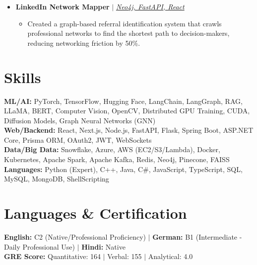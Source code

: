 \documentclass[10pt,a4paper]{article}
\newcommand{\resumeItem}[1]{\item\small{#1}}
\begin{document}
\begin{itemize}[label={}]
    \item \textbf{LinkedIn Network Mapper} $|$ \emph{\href{https://github.com/KartavyaDikshit/LinkedIn-Mapper}{Neo4j, FastAPI, React}}
    \begin{itemize}
        \resumeItem{Created a graph-based referral identification system that crawls professional networks to find the shortest path to decision-makers, reducing networking friction by 50\%.}
    \end{itemize}
\end{itemize}

\section{Skills}
\begin{itemize}[label={}]
    \small{\item{
     \textbf{ML/AI:}{ PyTorch, TensorFlow, Hugging Face, LangChain, LangGraph, RAG, LLaMA, BERT, Computer Vision, OpenCV, Distributed GPU Training, CUDA, Diffusion Models, Graph Neural Networks (GNN)} \\
     \textbf{Web/Backend:}{ React, Next.js, Node.js, FastAPI, Flask, Spring Boot, ASP.NET Core, Prisma ORM, OAuth2, JWT, WebSockets} \\
     \textbf{Data/Big Data:}{ Snowflake, Azure, AWS (EC2/S3/Lambda), Docker, Kubernetes, Apache Spark, Apache Kafka, Redis, Neo4j, Pinecone, FAISS} \\
     \textbf{Languages:}{ Python (Expert), C++, Java, C\#, JavaScript, TypeScript, SQL, MySQL, MongoDB, ShellScripting}
    }}
\end{itemize}

\section{Languages \& Certification}
\begin{itemize}[label={}]
    \small{\item{
     \textbf{English:}{ C2 (Native/Professional Proficiency)} $|$ \textbf{German:}{ B1 (Intermediate - Daily Professional Use)} $|$ \textbf{Hindi:}{ Native} \\
     \textbf{GRE Score:}{ Quantitative: 164 $|$ Verbal: 155 $|$ Analytical: 4.0}
    }}
\end{itemize}
\end{document}
